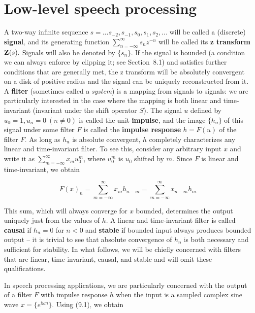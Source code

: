 \section{Low-level speech processing}

A two-way infinite sequence $s=\ldots s_{-2}, s_{-1}, s_0, s_1, s_2, \ldots$
will be called a (discrete) {\bf signal}, and its generating function
$\sum_{n=-\infty}^{\infty} s_n z^{-n}$ will be called its {\bf z transform}
${\bf Z}(s).$ Signals will also be denoted by
$\{s_n\}$. If the signal is
bounded (a condition we can always enforce by clipping it; see Section~8.1) and
satisfies further conditions that are generally met, the z transform will be
absolutely convergent on a disk of positive radius and the signal can be
uniquely reconstructed from it. A {\bf filter} (sometimes called a {\it
  system}) is a mapping from signals to
signals: we are particularly interested in the case where the mapping is both
linear and time-invariant (invariant under the shift operator $S$). The signal
$u$ defined by $u_0=1, u_n=0 \ (n\neq 0)$ is called the unit {\bf impulse},
and the image $\{h_n\}$ of this signal under some filter $F$ is called the
{\bf impulse response} $h=F(u)$ of the filter $F$. As long as $h_n$ is absolute convergent,
$h$ completely characterizes any linear and time-invariant filter. To see
this, consider any arbitrary input $x$ and write it as
$\sum_{m=-\infty}^{\infty}x_m u_0^m$, where $u_0^m$ is $u_0$ shifted by $m$.
Since $F$ is linear and time-invariant, we obtain

\begin{equation}
F(x)_n=\sum_{m=-\infty}^{\infty}x_mh_{n-m}=\sum_{m=-\infty}^{\infty}x_{n-m}h_m
\end{equation}

\noindent
This sum, which will always converge for $x$ bounded, determines the output
uniquely just from the values of $h$. A linear and time-invariant filter is
called {\bf causal} if $h_n =0$ for $n<0$ and {\bf stable} if bounded input
always produces bounded output -- it is trivial to see that absolute
convergence of $h_n$ is both necessary and sufficient for
stability. In what
follows, we will be chiefly concerned with filters that are linear,
time-invariant, causal, and stable and will omit these qualifications.

In speech processing applications, we are particularly concerned with the
output of a filter $F$ with impulse response $h$ when the input is a sampled
complex sine wave $x=\{e^{i\omega n}\}.$ Using (9.1), we obtain

